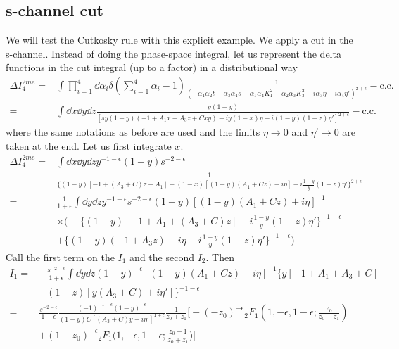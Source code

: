 \subsection{s-channel cut}
We will test the Cutkosky rule with this explicit example. 
We apply a cut in the s-channel.
Instead of doing the phase-space integral, let us represent the delta functions in the cut integral (up to a factor) in a distributional way
\begin{equation*}
\begin{split}
\Delta I_{4}^{2m e} = &
\int\prod_{i=1}^4 \dd \alpha_i \delta(\sum_{i=1}^4\alpha_i - 1)
\frac{1}{(-\alpha_1\alpha_2 t -\alpha_3\alpha_4 s- \alpha_1\alpha_4 K_1^2 - \alpha_2\alpha_3 K_3^2 - i\alpha_3\eta - i\alpha_4\eta')^{2+\epsilon}} 
- \mathrm{c.c.}
\\
 = &
\int\dd x \dd y \dd z
\frac{y(1-y)}{[sy(1-y)(-1 + A_1x + A_3 z + Cxy) - iy(1-x)\eta - i(1-y)(1-z)\eta']^{2+\epsilon}} -\mathrm{c.c.}
\end{split}
\end{equation*}
where the same notations as before are used and the limits $\eta\rightarrow 0$ and $\eta'\rightarrow 0$ are taken at the end.
Let us first integrate \wrt $x$.
\begin{equation*}
\begin{split}
\Delta I_4^{2me} = &
\int\dd x \dd y \dd z y^{-1-\epsilon}(1-y)s^{-2-\epsilon}
\\
&
\frac{1}{\big\{(1-y)[-1 + (A_3+C)z + A_1] - (1-x)[(1-y)(A_1 + Cz)  +i\eta]-i\frac{1-y}{y}(1-z)\eta'\big\}^{2+\epsilon}}
\\
= &
\frac{1}{1+\epsilon}
\int\dd y \dd z y^{-1-\epsilon}s^{-2-\epsilon}(1-y)[(1-y)(A_1 + Cz ) +i\eta]^{-1}
\\
& \times
\Big(-\{(1-y)[-1 + A_1 + (A_3 + C)z ] - i\frac{1-y}{y}(1-z)\eta'\}^{-1-\epsilon} 
\\
&
+\{(1-y)(-1 + A_3z) - i\eta - i\frac{1-y}{y}(1-z)\eta'\}^{-1-\epsilon}\Big)
\end{split}
\end{equation*}
Call the first term on the \rhs $I_1$ and the second $I_2$. Then
\begin{equation*}
\begin{split}
I_1 = &
-\frac{s^{-2-\epsilon}}{1+\epsilon}\int\dd y \dd z (1-y)^{-\epsilon}[(1-y)(A_1 + Cz) - i\eta]^{-1}
\{y[-1 + A_1 + A_3 + C ] 
\\
& - (1-z)[y(A_3 + C) + i\eta']\}^{-1-\epsilon}
\\
= &
\frac{s^{-2-\epsilon}}{1+\epsilon}\frac{(-1)^{-1-\epsilon}(1-y)^{-\epsilon}}{(1-y )C[(A_3+C)y + i\eta']^{1+\epsilon}}
\frac{1}{z_0 + z_1}\Big[-(-z_0)^{-\epsilon}{}_2F_1(1,-\epsilon, 1-\epsilon; \frac{z_0}{z_0 + z_1})
\\
& + (1-z_0)^{-\epsilon}{}_2F_1\big(1,-\epsilon, 1-\epsilon; \frac{z_0 -1 }{z_0+z_1}\big)\Big]
\end{split}
\end{equation*}

